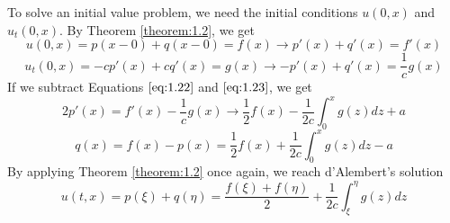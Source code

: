 \documentclass{article}
\numberwithin{equation}{section}
\begin{document}
To solve an initial value problem, we need the initial conditions $u(0,x)$ and $u_t(0,x)$. By Theorem \ref{theorem:1.2}, we get 
\begin{equation}
    u(0,x)=p(x-0)+q(x-0)=f(x) \rightarrow p'(x)+q'(x)=f'(x) \label{eq:1.22}
\end{equation} %
\begin{equation}
    u_t(0,x) = -cp'(x)+cq'(x) = g(x) \rightarrow-p'(x)+q'(x)=\frac{1}{c}g(x) \label{eq:1.23}
\end{equation} %
If we subtract Equations $\eqref{eq:1.22}$ and $\eqref{eq:1.23}$, we get 
\begin{equation*}
    2p'(x) = f'(x)-\frac{1}{c}g(x) \rightarrow \frac{1}{2}f(x)-\frac{1}{2c}\int^x_0g(z)dz + a 
\end{equation*}
\begin{equation*}
    q(x)=f(x)-p(x)=\frac{1}{2}f(x)+\frac{1}{2c}\int^x_0g(z)dz-a
\end{equation*}
By applying Theorem \ref{theorem:1.2} once again, we reach d'Alembert's solution
\begin{equation}
    u(t,x) = p(\xi)+q(\eta) = \frac{f(\xi)+f(\eta)}{2}+\frac{1}{2c}\int^\eta_\xi g(z)dz \label{eq:dASol}
\end{equation}
\end{document}
